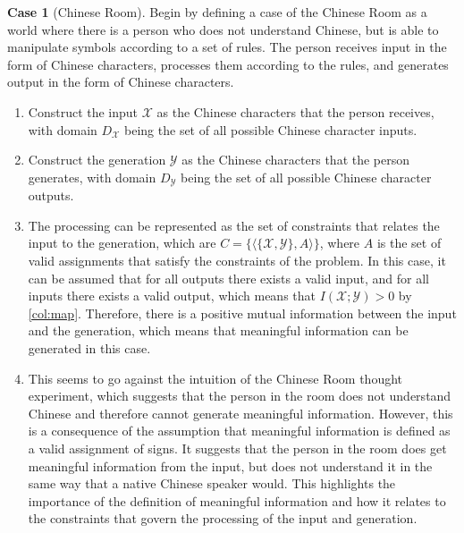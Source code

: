 \documentclass[stu,12pt]{apa7}
\theoremstyle{definition}
\newtheorem{case}{Case}[section]
\begin{document}
\begin{case}[Chinese Room]
    Begin by defining a case of the Chinese Room as a world where there is a person who does not understand Chinese, but is able to manipulate symbols according to a set of rules. The person receives input in the form of Chinese characters, processes them according to the rules, and generates output in the form of Chinese characters.
    \begin{enumerate}
        \item Construct the input $\mathcal{X}$ as the Chinese characters that the person receives, with domain $D_\mathcal{X}$ being the set of all possible Chinese character inputs.
        \item Construct the generation $\mathcal{Y}$ as the Chinese characters that the person generates, with domain $D_\mathcal{Y}$ being the set of all possible Chinese character outputs.
        \item The processing can be represented as the set of constraints that relates the input to the generation, which are $C = \{\langle \{\mathcal{X},\mathcal{Y}\}, A \rangle\}$, where $A$ is the set of valid assignments that satisfy the constraints of the problem. In this case, it can be assumed that for all outputs there exists a valid input, and for all inputs there exists a valid output, which means that \(I(\mathcal{X};\mathcal{Y}) > 0\) by \ref{col:map}. Therefore, there is a positive mutual information between the input and the generation, which means that meaningful information can be generated in this case.
        \item This seems to go against the intuition of the Chinese Room thought experiment, which suggests that the person in the room does not understand Chinese and therefore cannot generate meaningful information. However, this is a consequence of the assumption that meaningful information is defined as a valid assignment of signs. It suggests that the person in the room does get meaningful information from the input, but does not understand it in the same way that a native Chinese speaker would. This highlights the importance of the definition of meaningful information and how it relates to the constraints that govern the processing of the input and generation.
    \end{enumerate}
\end{case}
\end{document}
